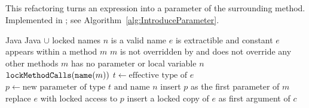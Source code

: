 \subsection{}
This refactoring turns an expression into a parameter of the surrounding method. Implemented in ; see Algorithm~\ref{alg:IntroduceParameter}.

\begin{algorithm}[p]
\caption{$\refactoring{Introduce Parameter}(e : \type{Expr}, n : \type{Name})$}
\label{alg:IntroduceParameter}
\begin{algorithmic}[1]
\REQUIRE Java
\ENSURE Java $\cup$ locked names
\medskip
\STATE \assert $n$ is a valid name
\STATE \assert $e$ is extractible and constant
\STATE \assert $e$ appears within a method $m$
\STATE \assert $m$ is not overridden by and does not override any other methods
\STATE \assert $m$ has no parameter or local variable $n$
\STATE $\text{\texttt{lockMethodCalls}}(\text{\texttt{name}}(m))$
\STATE $t \leftarrow \text{effective type of $e$}$
\STATE $p \leftarrow \text{new parameter of type $t$ and name $n$}$
\STATE insert $p$ as the first parameter of $m$
\STATE replace $e$ with locked access to $p$
  \STATE insert a locked copy of $e$ as first argument of $c$
\ENDFOR
\end{algorithmic}
\end{algorithm}
